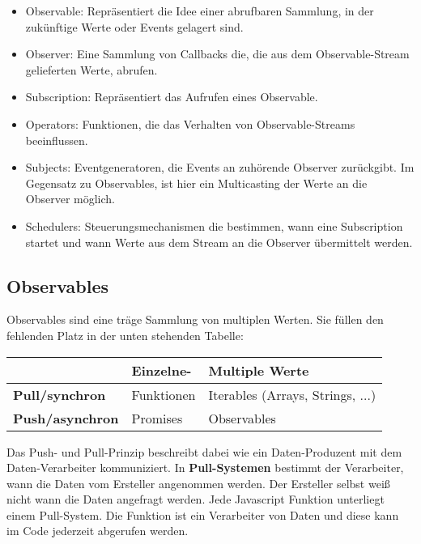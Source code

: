 \begin{itemize}
    \item Observable: Repräsentiert die Idee einer abrufbaren Sammlung, in der zukünftige Werte oder Events gelagert sind.
    \item Observer: Eine Sammlung von Callbacks die, die  aus dem Observable-Stream gelieferten Werte, abrufen.
    \item Subscription: Repräsentiert das Aufrufen eines Observable.
    \item Operators: Funktionen, die das Verhalten von Observable-Streams beeinflussen.
    \item Subjects: Eventgeneratoren, die Events an zuhörende Observer zurückgibt. Im Gegensatz zu Observables, ist hier ein Multicasting der Werte an die Observer möglich.
    \item Schedulers: Steuerungsmechanismen die bestimmen, wann eine Subscription startet und wann Werte aus dem Stream an die Observer übermittelt werden.
\end{itemize}

\subsection{Observables}

Observables sind eine träge Sammlung von multiplen Werten. Sie füllen den fehlenden Platz in der unten stehenden Tabelle:

\begin{center}
    \begin{tabular}{| l | l | l |}
    \hline
    & \textbf{Einzelne-} & \textbf{Multiple Werte} \\ \hline
    \textbf{Pull/synchron} & Funktionen & Iterables (Arrays, Strings, ...) \\ \hline
    \textbf{Push/asynchron} & Promises & Observables  \\ \hline
    \end{tabular}
\end{center}

\noindent
Das Push- und Pull-Prinzip beschreibt dabei wie ein Daten-Produzent mit dem Daten-Verarbeiter kommuniziert. In \textbf{Pull-Systemen} bestimmt der Verarbeiter, wann die Daten vom Ersteller angenommen werden. Der Ersteller selbst weiß nicht wann die Daten angefragt werden. Jede Javascript Funktion unterliegt einem Pull-System. Die Funktion ist ein Verarbeiter von Daten und diese kann im Code jederzeit abgerufen werden.\\


